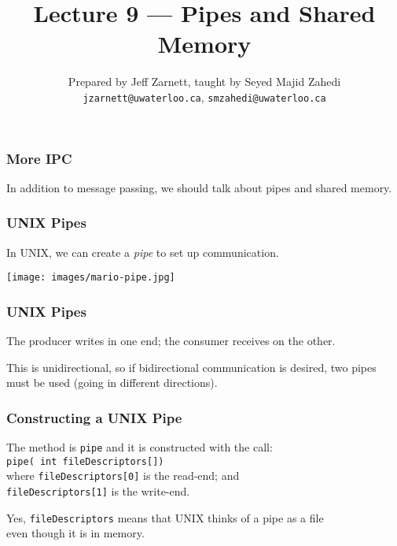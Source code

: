 

\title{Lecture 9 --- Pipes and Shared Memory}

\author{Prepared by Jeff Zarnett, taught by Seyed Majid Zahedi \\ \small \texttt{jzarnett@uwaterloo.ca}, \texttt{smzahedi@uwaterloo.ca}}
\date{}




\begin{frame}
	\titlepage

\end{frame}

\begin{frame}
	\frametitle{More IPC}

	In addition to message passing, we should talk about pipes and shared memory.


\end{frame}


\begin{frame}
	\frametitle{UNIX Pipes}

	In UNIX, we can create a \textit{pipe} to set up communication.

	\begin{center}
		\texttt{[image: images/mario-pipe.jpg]}
	\end{center}

\end{frame}

\begin{frame}
	\frametitle{UNIX Pipes}




	The producer writes in one end; the consumer receives on the other.

	This is unidirectional, so if bidirectional communication is desired, two pipes must be used (going in different directions).

\end{frame}

\begin{frame}
	\frametitle{Constructing a UNIX Pipe}

	The method is \texttt{pipe} and it is constructed with the call: \\
	\texttt{pipe( int fileDescriptors[])}\\
	\quad where \texttt{fileDescriptors[0]} is the read-end; and\\
	\quad \texttt{fileDescriptors[1]} is the write-end.

	Yes, \texttt{fileDescriptors} means that UNIX thinks of a pipe as a file\\
	\quad even though it is in memory.


\end{frame}

